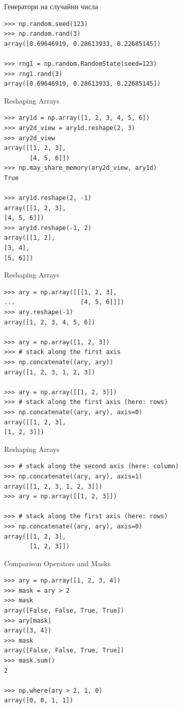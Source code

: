 \documentclass{beamer}
\begin{document}
\begin{frame}[fragile]{Генератори на случайни числа}
\begin{verbatim}
>>> np.random.seed(123)
>>> np.random.rand(3)
array([0.69646919, 0.28613933, 0.22685145])

>>> rng1 = np.random.RandomState(seed=123)
>>> rng1.rand(3)
array([0.69646919, 0.28613933, 0.22685145])
\end{verbatim}
\end{frame}

\begin{frame}[fragile]{Reshaping Arrays}
\begin{verbatim}
>>> ary1d = np.array([1, 2, 3, 4, 5, 6])
>>> ary2d_view = ary1d.reshape(2, 3)
>>> ary2d_view
array([[1, 2, 3],
       [4, 5, 6]])
>>> np.may_share_memory(ary2d_view, ary1d)
True

>>> ary1d.reshape(2, -1)
array([[1, 2, 3],
[4, 5, 6]])
>>> ary1d.reshape(-1, 2)
array([[1, 2],
[3, 4],
[5, 6]])
\end{verbatim}
\end{frame}

\begin{frame}[fragile]{Reshaping Arrays}
\begin{verbatim}
>>> ary = np.array([[[1, 2, 3],
...                  [4, 5, 6]]])
>>> ary.reshape(-1)
array([1, 2, 3, 4, 5, 6])

>>> ary = np.array([1, 2, 3])
>>> # stack along the first axis
>>> np.concatenate((ary, ary))
array([1, 2, 3, 1, 2, 3])

>>> ary = np.array([[1, 2, 3]])
>>> # stack along the first axis (here: rows)
>>> np.concatenate((ary, ary), axis=0)
array([[1, 2, 3],
[1, 2, 3]])
\end{verbatim}
\end{frame}

\begin{frame}[fragile]{Reshaping Arrays}
\begin{verbatim}
>>> # stack along the second axis (here: column)
>>> np.concatenate((ary, ary), axis=1)
array([[1, 2, 3, 1, 2, 3]])
>>> ary = np.array([[1, 2, 3]])

>>> # stack along the first axis (here: rows)
>>> np.concatenate((ary, ary), axis=0)
array([[1, 2, 3],
       [1, 2, 3]])
\end{verbatim}
\end{frame}

\begin{frame}[fragile]{Comparison Operators and Masks}
\begin{verbatim}
>>> ary = np.array([1, 2, 3, 4])
>>> mask = ary > 2
>>> mask
array([False, False, True, True])
>>> ary[mask]
array([3, 4])
>>> mask
array([False, False, True, True])
>>> mask.sum()
2

>>> np.where(ary > 2, 1, 0)
array([0, 0, 1, 1])
\end{verbatim}
\end{frame}
\end{document}
